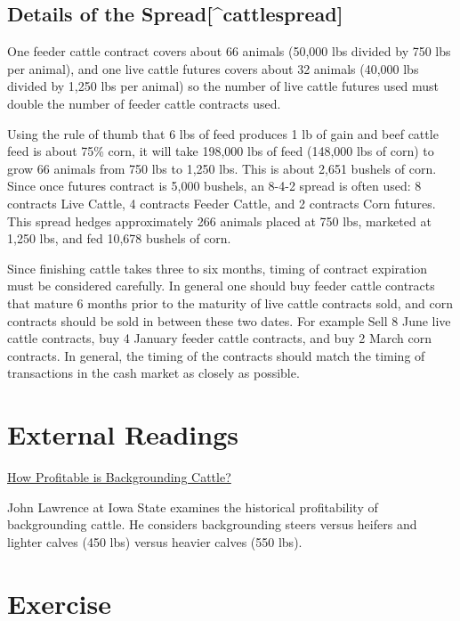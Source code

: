 \documentclass[
  letterpaper,
  DIV=11,
  numbers=noendperiod]{scrreprt}
\begin{document}
\subsection{Details of the
Spread{[}\^{}cattlespread{]}}\label{details-of-the-spreadcattlespread}

One feeder cattle contract covers about 66 animals (50,000 lbs divided
by 750 lbs per animal), and one live cattle futures covers about 32
animals (40,000 lbs divided by 1,250 lbs per animal) so the number of
live cattle futures used must double the number of feeder cattle
contracts used.

Using the rule of thumb that 6 lbs of feed produces 1 lb of gain and
beef cattle feed is about 75\% corn, it will take 198,000 lbs of feed
(148,000 lbs of corn) to grow 66 animals from 750 lbs to 1,250 lbs. This
is about 2,651 bushels of corn. Since once futures contract is 5,000
bushels, an 8-4-2 spread is often used: 8 contracts Live Cattle, 4
contracts Feeder Cattle, and 2 contracts Corn futures. This spread
hedges approximately 266 animals placed at 750 lbs, marketed at 1,250
lbs, and fed 10,678 bushels of corn.

Since finishing cattle takes three to six months, timing of contract
expiration must be considered carefully. In general one should buy
feeder cattle contracts that mature 6 months prior to the maturity of
live cattle contracts sold, and corn contracts should be sold in between
these two dates. For example Sell 8 June live cattle contracts, buy 4
January feeder cattle contracts, and buy 2 March corn contracts. In
general, the timing of the contracts should match the timing of
transactions in the cash market as closely as possible.

\section{External Readings}\label{external-readings}

\href{http://www2.econ.iastate.edu/faculty/lawrence/Acrobat/Backgrounding\%20Cattle.pdf}{How
Profitable is Backgrounding Cattle?}

John Lawrence at Iowa State examines the historical profitability of
backgrounding cattle. He considers backgrounding steers versus heifers
and lighter calves (450 lbs) versus heavier calves (550 lbs).

\section{Exercise}\label{exercise}
\end{document}
